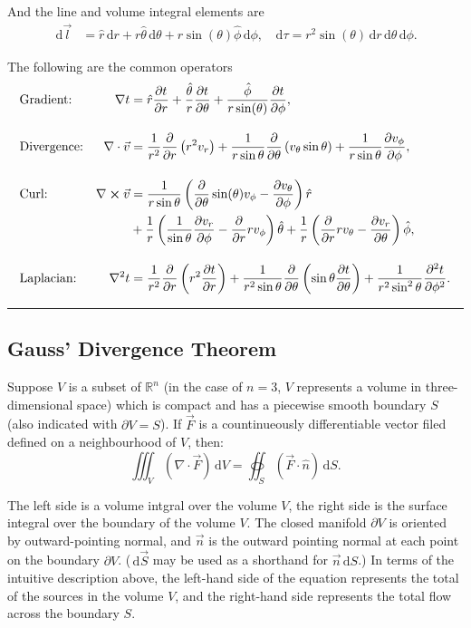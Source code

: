 \documentclass[a4paper]{article}
\newcommand{\dmr}[1]{\, \mathrm{d}#1} %
\numberwithin{equation}{subsection}
\begin{document}
And the line and volume integral elements are
\begin{align*}
    \dmr{\vec{l}} &= \hat{r}\dmr{r} + r\hat{\theta}\dmr{\theta} + r  \sin(\theta) \hat{\phi} \dmr{\phi}, & \dmr{\tau} = r^2 \sin(\theta) \dmr{r} \dmr{\theta} \dmr{\phi}.
\end{align*}

The following are the common operators
\begin{align*}
    &\text{Gradient:} &\nabla t  &= \hat{r}\pdv{t}{r} + \frac{\hat{\theta}}{r}\pdv{t}{\theta} + \frac{\hat{\phi}}{r \sin(\theta)}\pdv{t}{\phi},\\[1em]
    &\text{Divergence:} &\nabla\cdot\vec{v} &= \frac{1}{r^{2}} \frac{\partial}{\partial r}\left(r^{2} v_r \right)+\frac{1}{r \sin \theta} \frac{\partial}{\partial \theta}\left(v_{\theta} \sin \theta\right)+\frac{1}{r \sin \theta} \frac{\partial v_{\phi}}{\partial \phi},\\[1em]
    &\text{Curl:} &\nabla \cross \vec{v} &= \frac{1}{r\sin\theta}\left(\pdv{}{\theta}\sin(\theta) v_\phi- \pdv{v_\theta}{\phi}\right)\hat{r}\\
    &&&+\frac{1}{r}\left(\frac{1}{\sin\theta}\pdv{v_r}{\phi}-\pdv{}{r}  r v_\phi  \right)\hat{\theta}+ \frac{1}{r}\left(\pdv{}{r}rv_\theta-\pdv{v_r}{\theta}\right)\hat{\phi},\\[1em]
    &\text{Laplacian:} &\laplacian t &= \frac{1}{r^2}\pdv{}{r}\left(r^2\pdv{t}{r}\right)+ \frac{1}{r^2\sin\theta}\pdv{}{\theta}\left(\sin\theta\pdv{t}{\theta}\right) +\frac{1}{r^2 \sin^2 \theta}\pdv[2]{t}{\phi}.
\end{align*}

\par\noindent\rule{\textwidth}{0.4pt}

\subsection{Gauss' Divergence Theorem}
Suppose $V$ is a subset of $\mathbb{R}^n$ (in the case of $n=3$, $V$ represents a volume in three-dimensional space) which is compact and has a piecewise smooth boundary $S$ (also indicated with $\partial V = S$). If $\vec{F}$ is a countinueously differentiable vector filed defined on a neighbourhood of $V$, then:
\[
    \iiint_{V} \left(\nabla \cdot \vec{F}\right)\dmr{V} = \oiint_{S} \left(\vec{F}\cdot\hat{n}\right)\dmr{S}.
\]
\par The left side is a volume intgral over the volume $V$, the right side is the surface integral over the boundary of the volume $V$. The closed manifold $\partial V$ is oriented by outward-pointing normal, and $\vec{n}$ is the outward pointing normal at each point on the boundary $\partial V$. ($\dmr{\vec{S}}$ may be used as a shorthand for $\vec{n}\dmr{S}$.) In terms of the intuitive description above, the left-hand side of the equation represents the total of the sources in the volume $V$, and the right-hand side represents the total flow across the boundary $S$.\cite{noauthor_divergence_2021}
\end{document}
